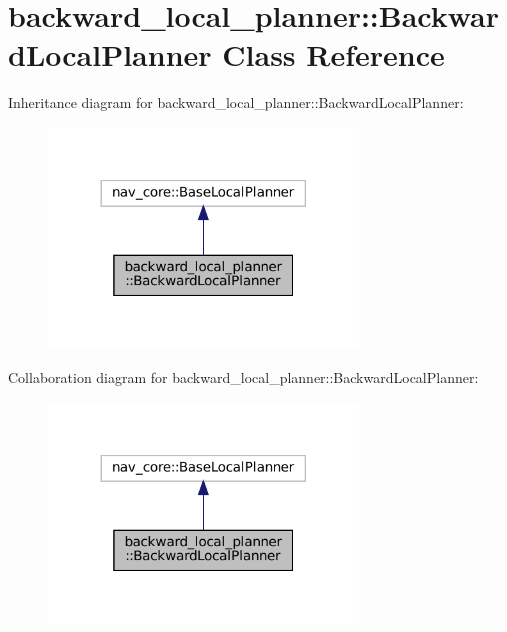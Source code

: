 \hypertarget{classbackward__local__planner_1_1BackwardLocalPlanner}{}\section{backward\+\_\+local\+\_\+planner\+:\+:Backward\+Local\+Planner Class Reference}
\label{classbackward__local__planner_1_1BackwardLocalPlanner}


Inheritance diagram for backward\+\_\+local\+\_\+planner\+:\+:Backward\+Local\+Planner\+:
\nopagebreak
\begin{figure}[H]
\begin{center}
\leavevmode
\includegraphics[width=233pt]{classbackward__local__planner_1_1BackwardLocalPlanner__inherit__graph}
\end{center}
\end{figure}


Collaboration diagram for backward\+\_\+local\+\_\+planner\+:\+:Backward\+Local\+Planner\+:
\nopagebreak
\begin{figure}[H]
\begin{center}
\leavevmode
\includegraphics[width=233pt]{classbackward__local__planner_1_1BackwardLocalPlanner__coll__graph}
\end{center}
\end{figure}
